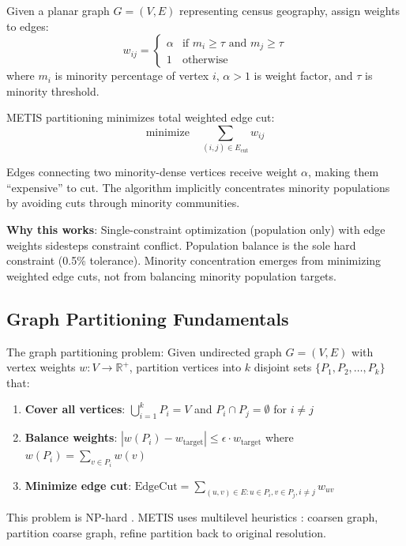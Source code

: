 Given a planar graph $G = (V, E)$ representing census geography, assign weights to edges:
\begin{equation}
w_{ij} = \begin{cases}
\alpha & \text{if } m_i \geq \tau \text{ and } m_j \geq \tau \\
1 & \text{otherwise}
\end{cases}
\end{equation}
where $m_i$ is minority percentage of vertex $i$, $\alpha > 1$ is weight factor, and $\tau$ is minority threshold.

METIS partitioning minimizes total weighted edge cut:
\begin{equation}
\text{minimize} \quad \sum_{(i,j) \in E_{\text{cut}}} w_{ij}
\end{equation}

Edges connecting two minority-dense vertices receive weight $\alpha$, making them ``expensive'' to cut. The algorithm implicitly concentrates minority populations by avoiding cuts through minority communities.

\textbf{Why this works}: Single-constraint optimization (population only) with edge weights sidesteps constraint conflict. Population balance is the sole hard constraint (0.5\% tolerance). Minority concentration emerges from minimizing weighted edge cuts, not from balancing minority population targets.

\subsection{Graph Partitioning Fundamentals}

The graph partitioning problem: Given undirected graph $G = (V, E)$ with vertex weights $w: V \to \mathbb{R}^+$, partition vertices into $k$ disjoint sets $\{P_1, P_2, \ldots, P_k\}$ that:

\begin{enumerate}
\item \textbf{Cover all vertices}: $\bigcup_{i=1}^k P_i = V$ and $P_i \cap P_j = \emptyset$ for $i \neq j$
\item \textbf{Balance weights}: $|w(P_i) - w_{\text{target}}| \leq \epsilon \cdot w_{\text{target}}$ where $w(P_i) = \sum_{v \in P_i} w(v)$
\item \textbf{Minimize edge cut}: $\text{EdgeCut} = \sum_{(u,v) \in E : u \in P_i, v \in P_j, i \neq j} w_{uv}$
\end{enumerate}

This problem is NP-hard \citep{garey1979}. METIS uses multilevel heuristics \citep{karypis1998}: coarsen graph, partition coarse graph, refine partition back to original resolution.

